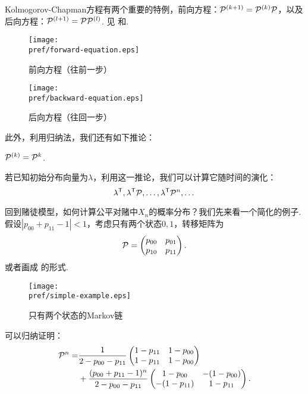 Kolmogorov-Chapman方程有两个重要的特例，前向方程：$\P^{(k+1)}=\P^{(k)}\P$，以及后向方程：$\P^{(l+1)}=\P\P^{(l)}$. 见 和.
\begin{figure}[ht]
    \begin{minipage}[t]{0.45\linewidth}
        \centering
        \texttt{[image: \\pref/forward-equation.eps]}
        \caption{前向方程（往前一步）}
        \label{fig:forward-equation}
    \end{minipage}
    \hfill
    \begin{minipage}[t]{0.45\linewidth}
        \centering
        \texttt{[image: \\pref/backward-equation.eps]}
        \caption{后向方程（往回一步）}
        \label{fig:backward-equation}
    \end{minipage}
\end{figure}

此外，利用归纳法，我们还有如下推论：
\begin{corollary}\label{cor:kolmogorov-chapman}
    $\P^{(k)}=\P^k$.    
\end{corollary}

若已知初始分布向量为$\lambda$，利用这一推论，我们可以计算它随时间的演化：
	\[\lambda^\t,\lambda^\t \P,\dots,\lambda^\t \P^n,\dots\] %

回到赌徒模型，如何计算公平对赌中$X_n$的概率分布？我们先来看一个简化的例子. 假设$|p_{00}+p_{11}-1|<1$，考虑只有两个状态$0,1$，转移矩阵为
	\[\P=\begin{pmatrix}p_{00}&p_{01}\\p_{10}&p_{11}
	\end{pmatrix}.\]
或者画成 的形式.
\begin{figure}
    \centering
    \texttt{[image: \\pref/simple-example.eps]}
    \caption{只有两个状态的Markov链}
    \label{fig:simple-example}
\end{figure}

可以归纳证明：
\begin{align*}
    \P^n=&\frac{1}{2-p_{00}-p_{11}}\begin{pmatrix}1-p_{11}&1-p_{00}\\1-p_{11}&1-p_{00}\end{pmatrix}\\
    &+\frac{(p_{00}+p_{11}-1)^n}{2-p_{00}-p_{11}}\begin{pmatrix}1-p_{00}&-(1-p_{00})\\-(1-p_{11})&1-p_{11}\end{pmatrix}.
\end{align*}


